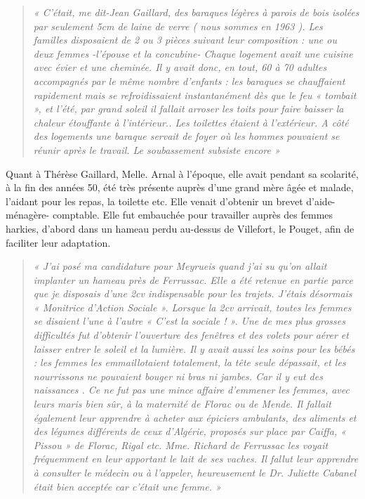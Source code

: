 \begin{quote}
\textit{« C’était, me dit-Jean Gaillard, des baraques légères à parois de bois isolées par
seulement 5cm de laine de verre ( nous sommes en 1963 ). Les familles disposaient de
2 ou 3 pièces suivant leur composition : une ou deux femmes -l’épouse et la
concubine- Chaque logement avait une cuisine avec évier et une cheminée. Il y avait
donc, en tout, 60 à 70 adultes accompagnés par le même nombre d’enfants : les
baraques se chauffaient rapidement mais se refroidissaient instantanément dès que le
feu « tombait », et l’été, par grand soleil il fallait arroser les toits pour faire baisser
la chaleur étouffante à l’intérieur.. Les toilettes étaient à l’extérieur. A côté des
logements une baraque servait de foyer où les hommes pouvaient se réunir après le
travail. Le soubassement subsiste encore »}
\end{quote}

Quant à Thérèse Gaillard, Melle. Arnal à l’époque, elle avait pendant sa scolarité, à la
fin des années 50, été très présente auprès d’une grand mère âgée et malade, l’aidant
pour les repas, la toilette etc. Elle venait d’obtenir un brevet d’aide-ménagère-
comptable. Elle fut embauchée pour travailler auprès des femmes harkies, d’abord
dans un hameau perdu au-dessus de Villefort, le Pouget, afin de faciliter leur
adaptation.

\begin{quote}
\textit{« J’ai posé ma candidature pour Meyrueis quand j’ai su qu’on allait implanter un
hameau près de Ferrussac. Elle a été retenue en partie parce que je disposais d’une
2cv indispensable pour les trajets. J’étais désormais « Monitrice d’Action Sociale ».
Lorsque la 2cv arrivait, toutes les femmes se disaient l’une à l’autre « C’est la
sociale ! ».
Une de mes plus grosses difficultés fut d’obtenir l’ouverture des fenêtres et des volets
pour aérer et laisser entrer le soleil et la lumière. Il y avait aussi les soins pour les
bébés : les femmes les emmaillotaient totalement, la tête seule dépassait, et les
nourrissons ne pouvaient bouger ni bras ni jambes. Car il y eut des naissances . Ce
ne fut pas une mince affaire d’emmener les femmes, avec leurs maris bien sûr, à la
maternité de Florac ou de Mende. Il fallait également leur apprendre à acheter aux
épiciers ambulants, des aliments et des légumes différents de ceux d’Algérie,
proposés sur place par Caiffa, « Pissou » de Florac, Rigal etc. Mme. Richard de
Ferrussac les voyait fréquemment en leur apportant le lait de ses vaches.
Il fallut leur apprendre à consulter le médecin ou à l’appeler, heureusement le Dr.
Juliette Cabanel était bien acceptée car c’était une femme. »}
\end{quote}

